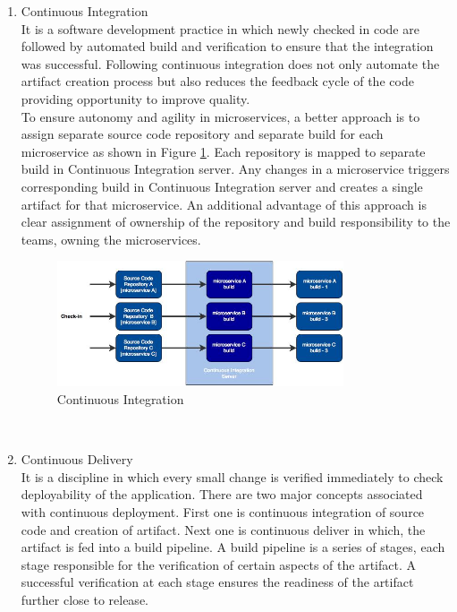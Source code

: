 \begin{enumerate}
\item Continuous Integration \\
It is a software development practice in which newly checked in code are followed by automated build and verification to ensure that the integration was successful. Following continuous integration does not only automate the artifact creation process but also reduces the feedback cycle of the code providing opportunity to improve quality.
\\
To ensure autonomy and agility in microservices, a better approach is to assign separate source code repository and separate build for each microservice as shown in Figure \ref{fig:challanges_of_microservices_architecture/deployment/continuous_integration}. Each repository is mapped to separate build in Continuous Integration server. Any changes in a microservice triggers corresponding build in Continuous Integration server and creates a single artifact for that microservice. An additional advantage of this approach is clear assignment of ownership of the repository and build responsibility to the teams, owning the microservices.  \cite{Newman:2015aa} \cite{Fowler:2006ab}
\begin{figure}[H]
\begin{center}
\includegraphics[width=0.8\textwidth]{figures/challenges_five_continuous_integration}
\caption{Continuous Integration \cite{Newman:2015aa}}
\label{fig:challanges_of_microservices_architecture/deployment/continuous_integration}
\end{center}
\end{figure}
\\
\item Continuous Delivery
\\
It is a discipline in which every small change is verified immediately to check deployability of the application. There are two major concepts associated with continuous deployment. First one is continuous integration of source code and creation of artifact. Next one is continuous deliver in which, the artifact is fed into a build pipeline. A build pipeline is a series of stages, each stage responsible for the verification of certain aspects of the artifact. A successful verification at each stage ensures the readiness of the artifact further close to release.

\end{enumerate}
